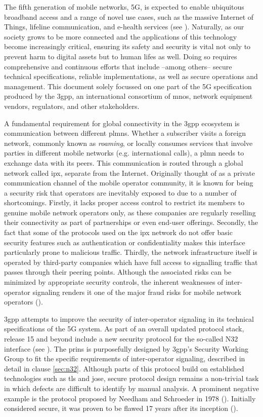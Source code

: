The fifth generation of mobile networks, 5G, is expected to enable ubiquitous broadband access and a range of novel use cases, such as the massive Internet of Things, lifeline communication, and e-health services (see \cite{ngmn5Gwhite}).
Naturally, as our society grows to be more connected and the applications of this technology become increasingly critical, ensuring its safety and security is vital not only to prevent harm to digital assets but to human lifes as well.
Doing so requires comprehensive and continuous efforts that include --among others-- secure technical specifications, reliable implementations, as well as secure operations and management.
This document solely focussed on one part of the 5G specification produced by the \gls{3gpp}, an international consortium of \glspl{mno}, network equipment vendors, regulators, and other stakeholders.

A fundamental requirement for global connectivity in the \gls{3gpp} ecosystem is communication between different \glspl{plmn}.
Whether a subscriber visits a foreign network, commonly known as \textit{roaming}, or locally consumes services that involve parties in different mobile networks (e.g. international calls), a \gls{plmn} needs to exchange data with its peers.
This communication is routed through a global network called \gls{ipx}, separate from the Internet.
Originally thought of as a private communication channel of the mobile operator community, it is known for being a security risk that operators are inevitably exposed to due to a number of shortcomings.
Firstly, it lacks proper access control to restrict its members to genuine mobile network operators only, as these companies are regularly reselling their connectivity as part of partnerships or even end-user offerings.
Secondly, the fact that some of the protocols used on the \gls{ipx} network do not offer basic security features such as authentication or confidentiality makes this interface particularly prone to malicious traffic.
Thirdly, the network infrastructure itself is operated by third-party companies which have full access to signalling traffic that passes through their peering points.
Although the associated risks can be minimized by appropriate security controls, the inherent weaknesses of inter-operator signaling renders it one of the major fraud risks for mobile network operators (\cite{sahin2017sok}).

\gls{3gpp} attempts to improve the security of inter-operator signaling in its technical specifications of the 5G system.
As part of an overall updated protocol stack, release 15 and beyond include a new security protocol for the so-called N32 interface (see \cite{3gpp.33.501}).
The \gls{prins} is purposefully designed by \gls{3gpp}'s Security Working Group to fit the specific requirements of inter-operator signaling, described in detail in clause \ref{sec:n32}.
Although parts of this protocol build on established technologies such as \gls{tls} and \gls{jose}, secure protocol design remains a non-trivial task in which defects are difficult to identify by manual analysis.
A prominent negative example is the protocol proposed by Needham and Schroeder in 1978 (\cite{needham1978using}).
Initially considered secure, it was proven to be flawed 17 years after its inception (\cite{lowe1996breaking}).

